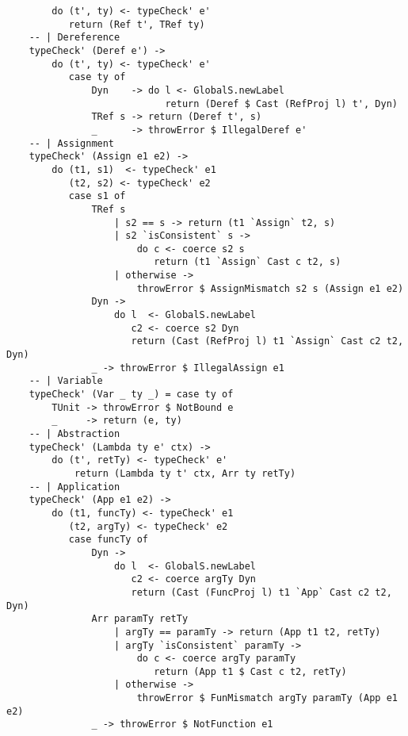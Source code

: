 \begin{lstlisting}
        do (t', ty) <- typeCheck' e'   
           return (Ref t', TRef ty)  
    -- | Dereference                           
    typeCheck' (Deref e') -> 
        do (t', ty) <- typeCheck' e' 
           case ty of 
               Dyn    -> do l <- GlobalS.newLabel
                            return (Deref $ Cast (RefProj l) t', Dyn)
               TRef s -> return (Deref t', s)
               _      -> throwError $ IllegalDeref e' 
    -- | Assignment
    typeCheck' (Assign e1 e2) -> 
        do (t1, s1)  <- typeCheck' e1 
           (t2, s2) <- typeCheck' e2 
           case s1 of 
               TRef s 
                   | s2 == s -> return (t1 `Assign` t2, s)
                   | s2 `isConsistent` s -> 
                       do c <- coerce s2 s
                          return (t1 `Assign` Cast c t2, s)
                   | otherwise -> 
                       throwError $ AssignMismatch s2 s (Assign e1 e2)
               Dyn -> 
                   do l  <- GlobalS.newLabel
                      c2 <- coerce s2 Dyn 
                      return (Cast (RefProj l) t1 `Assign` Cast c2 t2, Dyn)
               _ -> throwError $ IllegalAssign e1
    -- | Variable 
    typeCheck' (Var _ ty _) = case ty of                                            
        TUnit -> throwError $ NotBound e   
        _     -> return (e, ty) 
    -- | Abstraction
    typeCheck' (Lambda ty e' ctx) -> 
        do (t', retTy) <- typeCheck' e'            
            return (Lambda ty t' ctx, Arr ty retTy)  
    -- | Application
    typeCheck' (App e1 e2) -> 
        do (t1, funcTy) <- typeCheck' e1   
           (t2, argTy) <- typeCheck' e2
           case funcTy of 
               Dyn -> 
                   do l  <- GlobalS.newLabel 
                      c2 <- coerce argTy Dyn   
                      return (Cast (FuncProj l) t1 `App` Cast c2 t2, Dyn)
               Arr paramTy retTy 
                   | argTy == paramTy -> return (App t1 t2, retTy)
                   | argTy `isConsistent` paramTy -> 
                       do c <- coerce argTy paramTy  
                          return (App t1 $ Cast c t2, retTy)
                   | otherwise -> 
                       throwError $ FunMismatch argTy paramTy (App e1 e2)
               _ -> throwError $ NotFunction e1   
\end{lstlisting}